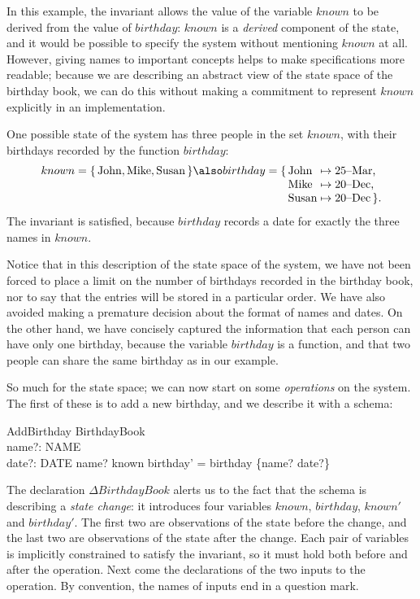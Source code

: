 \documentclass{llncs}
\begin{document}
In this example, the invariant allows the value of the variable
$known$ to be derived from the value of $birthday$: $known$ is a {\em
derived\/}%
component of the state, and it would be possible to
specify the system without mentioning $known$ at all.  However,
giving names to important concepts helps to make specifications more
readable; because we are describing an abstract view of the state space
of the birthday book, we can do this without making a
commitment to represent $known$ explicitly in an implementation.

One possible state of the system has three people in the set $known$,
with their birthdays recorded by the function $birthday$:
\[
	known = \{\,{\rm John, Mike, Susan}\,\} \\
\also
	birthday = \{\,\vtop{\halign{\strut#\hfil&${}\mapsto{}$#\hfil\cr
			John&  25--Mar,\cr
			Mike&  20--Dec,\cr
			Susan& 20--Dec\,\}.\cr}}
\]
The invariant is satisfied, because $birthday$ records a date for
exactly the three names in $known$.

Notice that in this description of the state space of the
system, we have not been forced to place a limit on the
number of birthdays recorded in the birthday book,
nor  to say that the
entries will be stored in a particular order. We have also
avoided making a premature decision about the format of
names and dates. On the other hand, we have concisely
captured the information that each person can have only one
birthday, because the variable $birthday$ is a function, and
that two people can share the same birthday as in our
example.

So much for the state space; we can now start on some {\em
operations\/} on the system. The first of these is to add a
new birthday, and we describe it with a schema:
\begin{schema}{AddBirthday}
     \Delta BirthdayBook \\
     name?: NAME \\
     date?: DATE
\where
     name? \notin known
\also
     birthday' = birthday \cup \{name? \mapsto date?\}
\end{schema}
The declaration $\Delta BirthdayBook$ alerts
us to the fact that the schema is describing a {\em state change}: it
introduces four variables $known$, $birthday$, $known'$ and
$birthday'$. The first two are observations of the state before the
change, and the last two are observations of the state after the
change. Each pair of variables is implicitly constrained to satisfy
the invariant, so it must hold both before and after the operation.
Next come the declarations of the two inputs to the operation.
By convention, the names of inputs end in a question mark.
\end{document}

